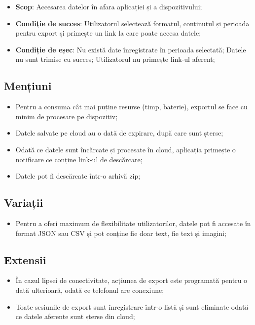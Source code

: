 \begin{itemize}
\item
  \textbf{Scop}: Accesarea datelor în afara aplicației și a dispozitivului;
\item
  \textbf{Condiție de succes}: Utilizatorul selectează formatul, conținutul și perioada pentru export și primește un link la care poate accesa datele;
\item
  \textbf{Condiție de eșec}: Nu există date înregistrate în perioada selectată; Datele nu sunt trimise cu succes; Utilizatorul nu primește link-ul aferent;
\end{itemize}

\begin{minipage}[t]{0.4\textwidth}

\subsection*{Mențiuni}\label{menux21biuni-3}

\begin{itemize}
  \item
  Pentru a consuma cât mai puține resurse (timp, baterie), exportul se face cu minim de procesare pe dispozitiv;
  \item
  Datele salvate pe cloud au o dată de expirare, după care sunt șterse;
  \item
  Odată ce datele sunt încărcate și procesate în cloud, aplicația primește o notificare ce conține link-ul de descărcare;
  \item
  Datele pot fi descărcate într-o arhivă zip;
\end{itemize}

\end{minipage}\hspace{0.05\textwidth}
\begin{minipage}[t]{0.55\textwidth}

\subsection*{Variații}\label{variaux21bii-2}

\begin{itemize}
\item
  Pentru a oferi maximum de flexibilitate utilizatorilor, datele pot fi accesate în format JSON sau CSV și pot conține fie doar text, fie text și imagini;
\end{itemize}

\subsection*{Extensii}\label{extensii-2}

\begin{itemize}
\item
  În cazul lipsei de conectivitate, acțiunea de export este programată pentru o dată ulterioară, odată ce telefonul are conexiune;
\item
  Toate sesiunile de export sunt înregistrare într-o listă și sunt eliminate odată ce datele aferente sunt șterse din cloud;
\end{itemize}

\end{minipage}



